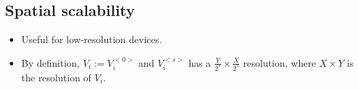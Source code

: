 \subsection{Spatial scalability}
\begin{itemize}
\item
  Useful for low-resolution devices.
\item
  By definition, $V_i:=V_i^{<0>}$ and $V_i^{<s>}$ has a
  $\frac{Y}{2^s}\times \frac{X}{2^s}$ resolution, where $X\times Y$
  is the resolution of $V_i$.
\end{itemize}


